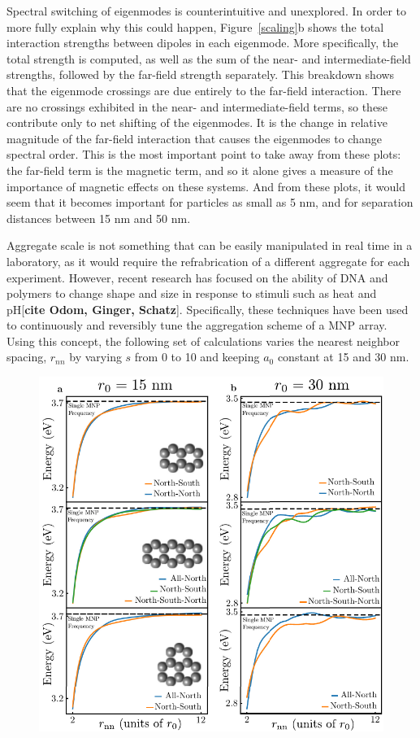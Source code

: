 \documentclass[journal=apchd5,manuscript=article]{achemso}
\begin{document}
Spectral switching of eigenmodes is counterintuitive and unexplored. In order to more fully explain why this could happen, Figure~\ref{scaling}b shows the total interaction strengths between dipoles in each eigenmode. More specifically, the total strength is computed, as well as the sum of the near- and intermediate-field strengths, followed by the far-field strength separately. This breakdown shows that the eigenmode crossings are due entirely to the far-field interaction. There are no crossings exhibited in the near- and intermediate-field terms, so these contribute only to net shifting of the eigenmodes. It is the change in relative magnitude of the far-field interaction that causes the eigenmodes to change spectral order. This is the most important point to take away from these plots: the far-field term is the magnetic term, and so it alone gives a measure of the importance of magnetic effects on these systems. And from these plots, it would seem that it becomes important for particles as small as 5 nm, and for separation distances between 15 nm and 50 nm.

Aggregate scale is not something that can be easily manipulated in real time in a laboratory, as it would require the refrabrication of a different aggregate for each experiment. However, recent research has focused on the ability of DNA and polymers to change shape and size in response to stimuli such as heat and pH[\textbf{cite Odom, Ginger, Schatz}]. Specifically, these techniques have been used to continuously and reversibly tune the aggregation scheme of a MNP array. Using this concept, the following set of calculations varies the nearest neighbor spacing, $r_{nn}$ by varying $s$ from 0 to 10 and keeping $a_0$ constant at 15 and 30 nm.

\begin{figure}
\includegraphics[width=7in]{spacing_study.pdf}
\caption{}
\label{spacing}
\end{figure}
\end{document}

